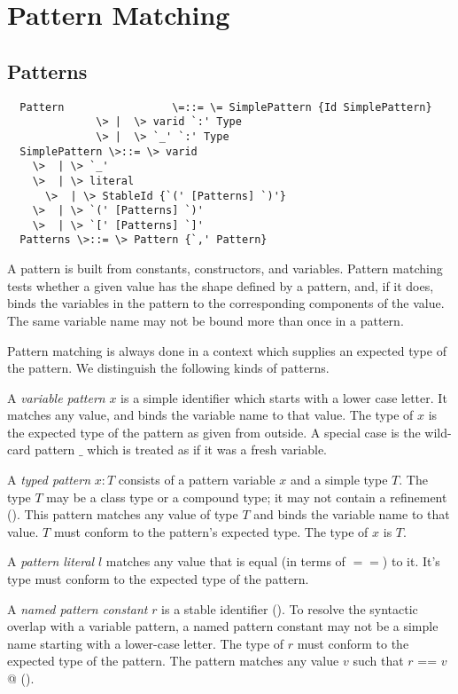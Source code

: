 \documentclass[11pt]{report}
\begin{document}
\chapter{Pattern Matching}

\section{Patterns}

\label{sec:patterns}

\syntax\begin{verbatim}
  Pattern                 \=::= \= SimplePattern {Id SimplePattern}
			  \> |  \> varid `:' Type
			  \> |  \> `_' `:' Type
  SimplePattern \>::= \> varid
  	\>  | \> `_'
	\>  | \> literal
      \>  | \> StableId {`(' [Patterns] `)'}
	\>  | \> `(' [Patterns] `)'
	\>  | \> `[' [Patterns] `]'
  Patterns \>::= \> Pattern {`,' Pattern}
\end{verbatim}

A pattern is built from constants, constructors, and
variables. Pattern matching tests whether a given value has the shape
defined by a pattern, and, if it does, binds the variables in the
pattern to the corresponding components of the value.  The same
variable name may not be bound more than once in a pattern.

Pattern matching is always done in a context which supplies an
expected type of the pattern. We distinguish the following kinds of patterns.

A {\em variable pattern} $x$ is a simple identifier which starts with
a lower case letter.  It matches any value, and binds the variable
name to that value.  The type of $x$ is the expected type of the
pattern as given from outside.  A special case is the wild-card
pattern $\_$ which is treated as if it was a fresh variable.

A {\em typed pattern} $x: T$ consists of a pattern variable $x$ and a
simple type $T$. The type $T$ may be a class type or a compound type;
it may not contain a refinement ().  This
pattern matches any value of type $T$ and binds the variable name to
that value.  $T$ must conform to the pattern's expected type. The
type of $x$ is $T$.

A {\em pattern literal} $l$ matches any value that is equal (in terms
of $==$) to it. It's type must conform to the expected type of the
pattern.

A {\em named pattern constant} $r$ is a stable identifier
(). To resolve the syntactic overlap with a
variable pattern, a named pattern constant may not be a simple name
starting with a lower-case letter. The type of $r$ must conform
to the expected type of the pattern. The pattern matches any value $v$
such that \verb@$r$ == $v$@ ().
\end{document}
